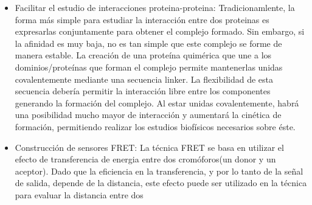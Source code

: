 \begin{itemize}
\item Facilitar el estudio de interacciones proteina-proteina\cite{reddy2013linkers}: 
Tradicionamlente, la forma más simple para estudiar la interacción entre dos proteinas es expresarlas conjuntamente para obtener el complejo formado.
Sin embargo, si la afinidad es muy baja, no es tan simple que este complejo se forme de manera estable.
La creación de una proteína quimérica que une a los dominios/proteínas que forman el complejo permite mantenerlas unidas covalentemente mediante una secuencia linker.
La flexibilidad de esta secuencia debería permitir la interacción libre entre los componentes generando la formación del complejo. Al estar unidas covalentemente, habrá una posibilidad mucho mayor de interacción y aumentará la cinética de 
formación, permitiendo realizar los estudios biofísicos necesarios sobre éste.
\item Construcción de sensores FRET:
La técnica FRET se basa en utilizar el efecto de transferencia de energia entre dos cromóforos(un donor y un aceptor).
Dado que la eficiencia en la transferencia, y por lo tanto de la señal de salida, depende de la distancia, este efecto puede ser utilizado en la técnica para evaluar la distancia entre dos 

\end{itemize}
